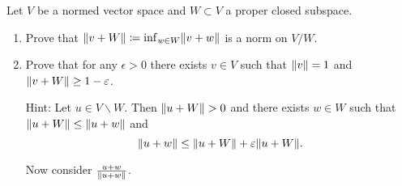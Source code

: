 \documentclass[a4paper, 10pt]{article}
\begin{document}
\begin{problem} 
    Let $V$ be a normed vector space and $W \subset V$ a proper closed subspace.
    \begin{enumerate}
    \item Prove that $\lVert v + W\rVert \coloneqq \inf_{w \in W} \lVert v + w\rVert$ is a norm on $V / W$.
    \item Prove that for any $\epsilon > 0$ there exists $v \in V$ such that $\lVert v\rVert = 1$ and $\lVert v + W\rVert \geq 1 - \varepsilon$.
    
    Hint: Let $u \in V\backslash W$. Then $\lVert u + W\rVert > 0$ and there exists $w \in W$ such that $\lVert u + W\rVert \leq \lVert u + w\rVert$ and \begin{equation*}
    \lVert u + w\rVert \leq \lVert u + W\rVert + \varepsilon \lVert u + W\rVert.
    \end{equation*}

    Now consider $\frac{u + w}{\lVert u + w\rVert}$.
    \end{enumerate}
\end{problem}
\end{document}
